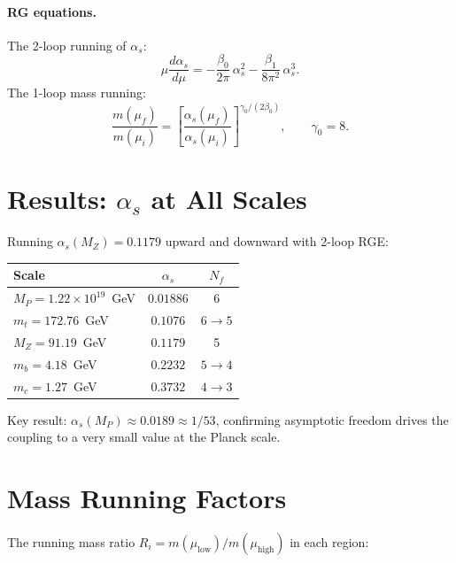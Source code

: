 \documentclass[11pt]{article}
\begin{document}
\paragraph{RG equations.}
The 2-loop running of $\alpha_s$:
\begin{equation}
\mu \frac{d\alpha_s}{d\mu} = -\frac{\beta_0}{2\pi}\,\alpha_s^2 - \frac{\beta_1}{8\pi^2}\,\alpha_s^3.
\end{equation}
The 1-loop mass running:
\begin{equation}
\frac{m(\mu_f)}{m(\mu_i)} = \left[\frac{\alpha_s(\mu_f)}{\alpha_s(\mu_i)}\right]^{\gamma_0/(2\beta_0)},
\qquad \gamma_0 = 8.
\end{equation}

\section{Results: $\alpha_s$ at All Scales}

Running $\alpha_s(M_Z) = 0.1179$ upward and downward with 2-loop RGE:

\begin{center}
\begin{tabular}{lcc}
\toprule
Scale & $\alpha_s$ & $N_f$ \\
\midrule
$M_P = 1.22 \times 10^{19}$~GeV & $0.01886$ & 6 \\
$m_t = 172.76$~GeV & $0.1076$ & $6 \to 5$ \\
$M_Z = 91.19$~GeV & $0.1179$ & 5 \\
$m_b = 4.18$~GeV & $0.2232$ & $5 \to 4$ \\
$m_c = 1.27$~GeV & $0.3732$ & $4 \to 3$ \\
\bottomrule
\end{tabular}
\end{center}

Key result: \textbf{$\alpha_s(M_P) \approx 0.0189 \approx 1/53$}, confirming asymptotic freedom drives the coupling to a very small value at the Planck scale.

\section{Mass Running Factors}

The running mass ratio $R_i = m(\mu_{\mathrm{low}})/m(\mu_{\mathrm{high}})$ in each region:
\end{document}
